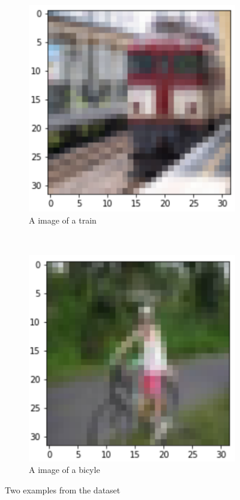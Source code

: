\documentclass[11pt,a4paper]{report}
\begin{document}
\begin{figure}[h!]
    \centering
    \begin{subfigure}[b]{0.4\textwidth}
        \includegraphics[width=\textwidth]{figs/train.png}
        \caption{A image of a train}
        \label{fig:train}
    \end{subfigure}
    \qquad
    ~ %
    \begin{subfigure}[b]{0.4\textwidth}
        \includegraphics[width=\textwidth]{figs/bike.png}
        \caption{A image of a bicyle}
        \label{fig:bike}
    \end{subfigure}
    \caption{Two examples from the dataset}
    \label{fig:dataset}
\end{figure}
\end{document}
